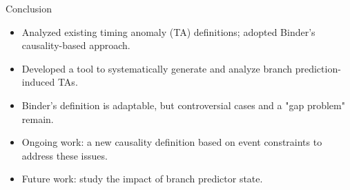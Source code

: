 \documentclass{beamer}
\begin{document}
\begin{frame}{Conclusion}
    \begin{itemize}
        \item Analyzed existing timing anomaly (TA) definitions; adopted Binder's causality-based approach.
        \item Developed a tool to systematically generate and analyze branch prediction-induced TAs.
        \item Binder's definition is adaptable, but controversial cases and a "gap problem" remain.
        \item Ongoing work: a new causality definition based on event constraints to address these issues.
        \item Future work: study the impact of branch predictor state.
    \end{itemize}
\end{frame}
\end{document}

